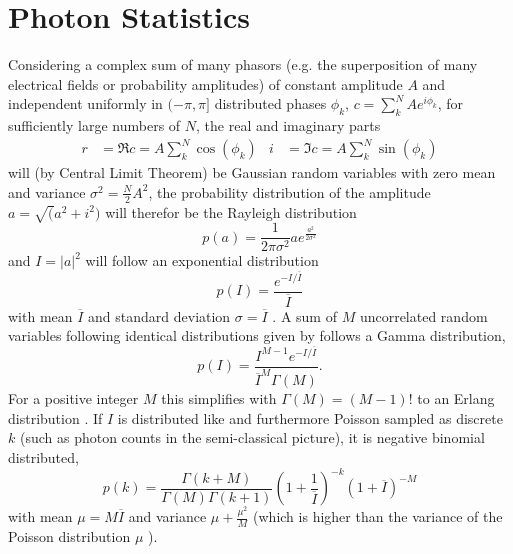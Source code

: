\section{Photon Statistics}
Considering a complex sum of many phasors (e.g. the superposition of many electrical fields or probability amplitudes) of constant amplitude $A$ and independent uniformly in $(-\pi,\pi]$ distributed phases $\phi_k$, $c=\sum^N_k A e^{i\phi_k}$, for sufficiently large numbers of $N$, the real and imaginary parts
\begin{align*}
	r&=\Re c =  A \sum^N_k \cos(\phi_k) &
	i&= \Im c =A \sum^N_k \sin(\phi_k)
\end{align*}
will (by Central Limit Theorem) be Gaussian random variables with zero mean and variance $\sigma^2=\frac{N}{2}A^2$, the probability distribution of the amplitude $a=\sqrt(a^2+i^2)$ will therefor be the Rayleigh distribution
\begin{equation}
	p(a)=\frac{1}{2\pi\sigma^2} a e^{\frac{a^2}{2\sigma^2}}
\end{equation}
and  $I=\left|a\right|^2$ will  follow an exponential distribution
\begin{equation}
	\label{eq:expdistr}
	p(I)=\frac{ e^{-I/\overline{I}}}{\overline{I}}
\end{equation} 
with mean $\overline{I}$ and standard deviation $\sigma=\overline{I}$  \cite{goodman2000,goodman1976}.
A sum of $M$ uncorrelated random variables following identical distributions given by  follows a Gamma distribution,
\begin{equation}
	\label{eq:gammadistr}
	p(I)=\frac{I^{M-1} e^{-I/\overline{I}}} {\overline{I}^M \Gamma(M)}.
\end{equation}
For a positive integer $M$ this simplifies with $\Gamma(M)=(M-1)!$ to an Erlang distribution  \cite{forbes2010,trost2020}.
If $I$ is distributed like  and furthermore Poisson sampled as discrete $k$ (such as photon counts in the semi-classical picture), it is negative binomial distributed,
\cite{trost2020,mandel1959,holmes2019}
\begin{equation}
	p(k)=
	\frac{\Gamma(k+M)}{\Gamma(M)\Gamma(k+1) }
	\left( 1+\frac{1}{\overline{I}}
	\right)^{-k}
	\left( 1+\overline{I}
	\right)^{-M}
	\label{eq:negbinomialdist}
\end{equation}
with mean $\mu=M\overline{I}$ and variance $\mu+\frac{\mu^2}{M}$ (which is higher than the variance of the Poisson distribution $\mu$ ).

